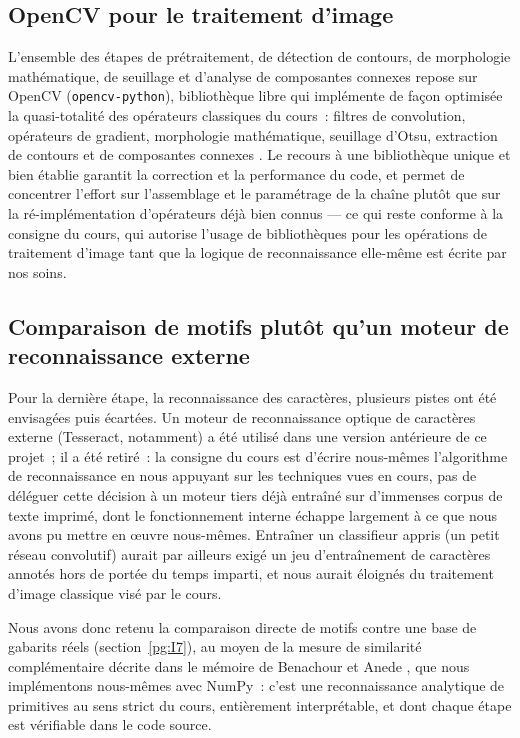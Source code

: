 \documentclass[11pt,a4paper]{article}
\begin{document}
\subsection{OpenCV pour le traitement d'image}
\label{pg:II2}

L'ensemble des étapes de prétraitement, de détection de contours, de morphologie mathématique, de seuillage et d'analyse de composantes connexes repose sur OpenCV (\texttt{opencv-python}), bibliothèque libre qui implémente de façon optimisée la quasi-totalité des opérateurs classiques du cours~: filtres de convolution, opérateurs de gradient, morphologie mathématique, seuillage d'Otsu, extraction de contours et de composantes connexes \cite{ref_opencv}. Le recours à une bibliothèque unique et bien établie garantit la correction et la performance du code, et permet de concentrer l'effort sur l'assemblage et le paramétrage de la chaîne plutôt que sur la ré-implémentation d'opérateurs déjà bien connus --- ce qui reste conforme à la consigne du cours, qui autorise l'usage de bibliothèques pour les opérations de traitement d'image tant que la logique de reconnaissance elle-même est écrite par nos soins.

\subsection{Comparaison de motifs plutôt qu'un moteur de reconnaissance externe}
\label{pg:II3}

Pour la dernière étape, la reconnaissance des caractères, plusieurs pistes ont été envisagées puis écartées. Un moteur de reconnaissance optique de caractères externe (Tesseract, notamment) a été utilisé dans une version antérieure de ce projet~; il a été retiré~: la consigne du cours est d'écrire nous-mêmes l'algorithme de reconnaissance en nous appuyant sur les techniques vues en cours, pas de déléguer cette décision à un moteur tiers déjà entraîné sur d'immenses corpus de texte imprimé, dont le fonctionnement interne échappe largement à ce que nous avons pu mettre en œuvre nous-mêmes. Entraîner un classifieur appris (un petit réseau convolutif) aurait par ailleurs exigé un jeu d'entraînement de caractères annotés hors de portée du temps imparti, et nous aurait éloignés du traitement d'image classique visé par le cours.

Nous avons donc retenu la comparaison directe de motifs contre une base de gabarits réels (section~\ref{pg:I7}), au moyen de la mesure de similarité complémentaire décrite dans le mémoire de Benachour et Anede \cite{ref_blida}, que nous implémentons nous-mêmes avec NumPy~: c'est une reconnaissance analytique de primitives au sens strict du cours, entièrement interprétable, et dont chaque étape est vérifiable dans le code source.
\end{document}
